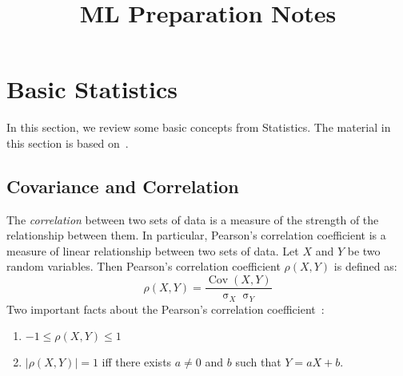 \documentclass[11pt,a4]{article}
\title{ML Preparation Notes}
\DeclareMathOperator{\cov}{Cov}
\DeclareMathOperator{\sd}{\sigma}
\theoremstyle{definition}
\begin{document}
\maketitle

\section{Basic Statistics}
In this section, we review some basic concepts from Statistics. The material 
in this section is based on~\cite{DegSch}.

\subsection{Covariance and Correlation}

The \emph{correlation} between two sets of data is a measure of the strength of
the relationship between them. In particular, Pearson's correlation coefficient
is a measure of linear relationship between two sets of data. Let $X$ and $Y$
be two random variables. Then Pearson's correlation coefficient $\rho(X, Y)$ is
defined as:
\begin{equation}
    \rho(X, Y) = \frac{\cov(X, Y)}{\sd_X \sd_Y} 
\end{equation}  
Two important facts about the Pearson's correlation coefficient~\cite{CasBer}:
\begin{enumerate}
	\item $-1 \leq \rho(X, Y) \leq 1$
	\item $|\rho(X, Y)| = 1$ iff there exists $a \neq 0$ and $b$ such that 
	$Y = aX + b$.
\end{enumerate}
\end{document}
